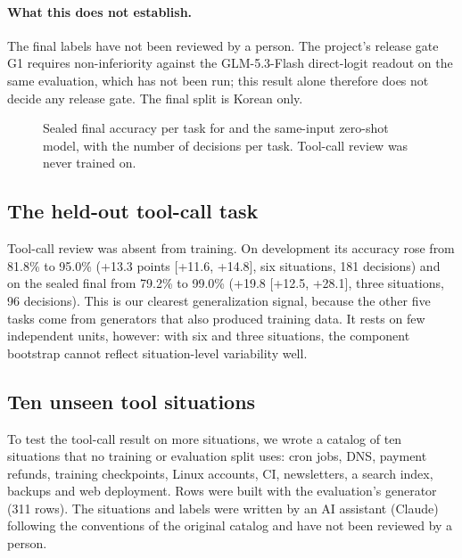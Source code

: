 \paragraph{What this does not establish.}
The final labels have not been reviewed by a person. The project's release gate G1 requires
non-inferiority against the GLM-5.3-Flash direct-logit readout on the same evaluation, which
has not been run; this result alone therefore does not decide any release gate. The final
split is Korean only.

\begin{figure}[t]
\centering
{}
\caption{Sealed final accuracy per task for \expone{} and the same-input zero-shot model,
with the number of decisions per task. Tool-call review was never trained on.}
\label{fig:final}
\end{figure}

\subsection{The held-out tool-call task}
\label{sec:heldout}

Tool-call review was absent from training. On development its accuracy rose from 81.8\% to
95.0\% (+13.3 points [+11.6, +14.8], six situations, 181 decisions) and on the sealed final
from 79.2\% to 99.0\% (+19.8 [+12.5, +28.1], three situations, 96 decisions). This is our
clearest generalization signal, because the other five tasks come from generators that also
produced training data. It rests on few independent units, however: with six and three
situations, the component bootstrap cannot reflect situation-level variability well.

\subsection{Ten unseen tool situations}
\label{sec:toolood}

To test the tool-call result on more situations, we wrote a catalog of ten situations that
no training or evaluation split uses: cron jobs, DNS, payment refunds, training checkpoints,
Linux accounts, CI, newsletters, a search index, backups and web deployment. Rows were built
with the evaluation's generator (311 rows). The situations and labels were written by an AI
assistant (Claude) following the conventions of the original catalog and have not been
reviewed by a person.

